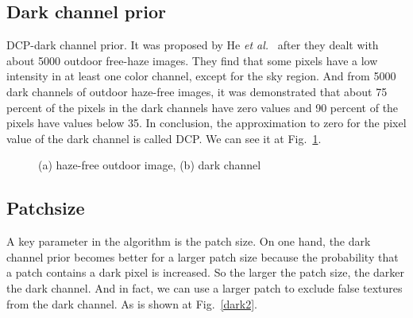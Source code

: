 \documentclass[10pt,twocolumn,letterpaper]{article}
\begin{document}
\subsection{Dark channel prior}
\par DCP-dark channel prior. It was proposed by He \emph {et al.}~\cite{He2009Single} after they dealt with about 5000 outdoor free-haze images. They find that some pixels have a low intensity in at least one color channel, except for the sky region. And from 5000 dark channels of outdoor haze-free images, it was demonstrated that about 75 percent of the pixels in the dark channels have zero values and 90 percent of the pixels have values below 35. In conclusion, the approximation to zero for the pixel value of the dark channel is called DCP. We can see it at Fig.~\ref{dark1}.
 \begin{figure}[htbp]
 \centering{}
 \hfill
{}
 \caption{(a) haze-free outdoor image, (b) dark channel}
\label{dark1}
\end{figure} 
\subsection{Patchsize}
 \par A key parameter in the algorithm is the patch size. On one hand, the dark channel prior becomes better for a larger patch size because the probability that a patch contains a dark pixel is increased. So the larger the patch size, the darker the dark channel. And in fact, we can use a larger patch to exclude false textures from the dark channel. As is shown at Fig.~\ref{dark2}.
 
\end{document}
